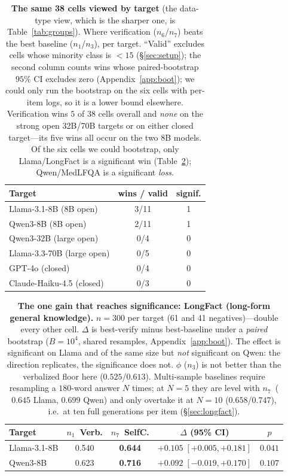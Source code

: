 \documentclass[11pt]{article}
\newcommand{\nverb}{$n_1$}     %
\newcommand{\nphi}{$n_3$}      %
\newcommand{\nyn}{$n_6$}       %
\newcommand{\nsc}{$n_7$}       %
\begin{document}
\begin{table}[t]
\centering\small
\begin{tabular}{lcc}
\toprule
Target & wins / valid & signif. \\
\midrule
Llama-3.1-8B (8B open)     & 3/11 & 1 \\
Qwen3-8B (8B open)         & 2/11 & 1 \\
Qwen3-32B (large open)     & 0/4  & 0 \\
Llama-3.3-70B (large open) & 0/5  & 0 \\
GPT-4o (closed)            & 0/4  & 0 \\
Claude-Haiku-4.5 (closed)  & 0/3  & 0 \\
\bottomrule
\end{tabular}
\caption{\textbf{The same 38 cells viewed by target} (the data-type view, which is the sharper
one, is Table~\ref{tab:groups}). Where verification (\nyn/\nsc) beats the best baseline
(\nverb/\nphi), per target. ``Valid'' excludes cells whose minority class is $<15$ (\S\ref{sec:setup}); the
second column counts wins whose paired-bootstrap $95\%$ CI excludes zero
(Appendix~\ref{app:boot}); we could only run the bootstrap on the six cells with per-item logs,
so it is a lower bound elsewhere.
Verification wins $5$ of $38$ cells overall and \emph{none} on the strong open 32B/70B targets
or on either closed target---its five wins all occur on the two 8B models. Of the six cells we
could bootstrap, only Llama/LongFact is a significant win (Table~\ref{tab:longfact});
Qwen/MedLFQA is a significant \emph{loss}.}
\label{tab:winrate}
\end{table}

\begin{table}[t]
\centering\small
\begin{tabular}{lcccc}
\toprule
Target & \nverb\ Verb. & \nsc\ SelfC. & $\Delta$ (95\% CI) & $p$ \\
\midrule
Llama-3.1-8B & 0.540 & \textbf{0.644} & $+0.105\;[+0.005,+0.181]$ & $0.041$ \\
Qwen3-8B     & 0.623 & \textbf{0.716} & $+0.092\;[-0.019,+0.170]$ & $0.107$ \\
\bottomrule
\end{tabular}
\caption{\textbf{The one gain that reaches significance: LongFact (long-form general
knowledge).} $n{=}300$ per target (61 and 41 negatives)---double every other cell. $\Delta$ is
best-verify minus best-baseline under a \emph{paired} bootstrap ($B{=}10^4$, shared resamples,
Appendix~\ref{app:boot}). The effect is significant on Llama and of the same size but
\emph{not} significant on Qwen: the direction replicates, the significance does not. $\phi$
(\nphi) is not better than the verbalized floor here ($0.525$/$0.613$). Multi-sample baselines
require resampling a $180$-word answer $N$ times; at $N{=}5$ they are level with \nsc\ ($0.645$
Llama, $0.699$ Qwen) and only overtake it at $N{=}10$ ($0.658$/$0.747$), i.e.\ at ten full
generations per item (\S\ref{sec:longfact}).}
\label{tab:longfact}
\end{table}
\end{document}
